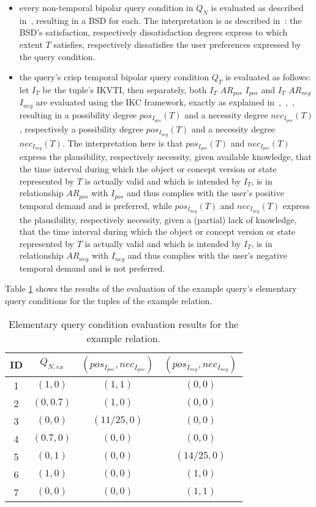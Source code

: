 \documentclass[runningheads,a4paper]{llncs}
\begin{document}
\begin{itemize}
\item every non-temporal bipolar query condition in $Q_N$ is evaluated as described in~\cite{Matthe2011ijis}, resulting in a BSD for each. The interpretation is as described in~\cite{Matthe2011ijis}: the BSD's satisfaction, respectively dissatisfaction degrees express to which extent $T$ satisfies, respectively dissatisfies the user preferences expressed by the query condition.
\item the query's crisp temporal bipolar query condition $Q_T$ is evaluated as follows: let $I_T$ be the tuple's IKVTI, then separately, both $I_T$ $AR_{pos}$ $I_{pos}$ and $I_T$ $AR_{neg}$ $I_{neg}$ are evaluated using the IKC framework, exactly as explained in~\cite{Pons2013ijufkbs},~\cite{Pons2012ijcis},~\cite{Pons2012ipmu}, resulting in a possibility degree $pos_{I_{pos}}(T)$ and a necessity degree $nec_{I_{pos}}(T)$, respectively a possibility degree $pos_{I_{neg}}(T)$ and a necessity degree $nec_{I_{neg}}(T)$. The interpretation here is that $pos_{I_{pos}}(T)$ and $nec_{I_{pos}}(T)$ express the plausibility, respectively necessity, given available knowledge, that the time interval during which the object or concept version or state represented by $T$ is actually valid and which is intended by $I_T$, is in relationship $AR_{pos}$ with $I_{pos}$ and thus complies with the user's positive temporal demand and is preferred, while $pos_{I_{neg}}(T)$ and $nec_{I_{neg}}(T)$ express the plausibility, respectively necessity, given a (partial) lack of knowledge, that the time interval during which the object or concept version or state represented by $T$ is actually valid and which is intended by $I_T$, is in relationship $AR_{neg}$ with $I_{neg}$ and thus complies with the user's negative temporal demand and is not preferred.
\end{itemize}

Table \ref{tab:ex-evaluation} shows the results of the evaluation of the example query's elementary query conditions for the tuples of the example relation.

\begin{table}[ht]
\caption{Elementary query condition evaluation results for the example relation.}
\centering
\begin{tabular}{|c|c|c|c|}
\hline
\textbf{ID} & \textbf{$Q_{N,ex}$} & \textbf{$(pos_{I_{pos}}, nec_{I_{pos}})$} & \textbf{$(pos_{I_{neg}}, nec_{I_{neg}})$} \\
\hline
\hline
1 & $(1, 0)$ & $(1,1)$ & $(0,0)$ \\
2 & $(0, 0.7)$ & $(1,0)$ & $(0,0)$ \\
3 & $(0, 0)$ & $(11/25,0)$ & $(0,0)$ \\
4 & $(0.7, 0)$ & $(0,0)$ & $(0,0)$ \\
5 & $(0, 1)$ & $(0,0)$ & $(14/25,0)$ \\
6 & $(1, 0)$ & $(0,0)$ & $(1,0)$ \\
7 & $(0, 0)$ & $(0,0)$ & $(1,1)$ \\
\hline
\end{tabular}
\label{tab:ex-evaluation}
\end{table}
\vspace{-10pt}
\end{document}
